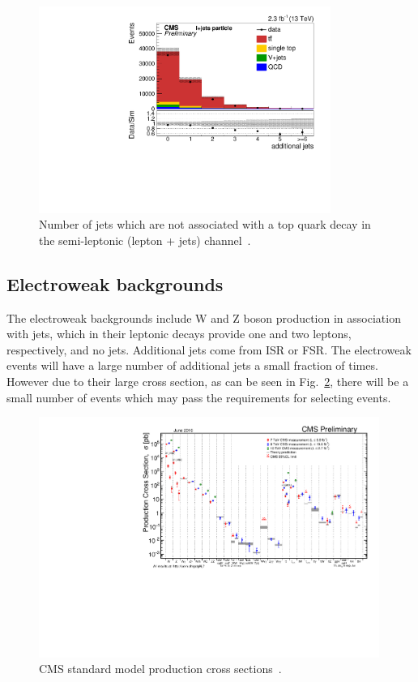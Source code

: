 \begin{figure}[ht!]
\begin{center}
    \includegraphics[width=0.85\textwidth]{images/Theory/ttbarAdd.pdf}
    \caption{Number of jets which are not associated with a top quark decay in the \ttbar semi-leptonic (lepton + jets) channel~\cite{CMS-PAS-TOP-16-008}.}
    \label{fig:ttbarAdd}
\end{center}
\end{figure}

\subsection{Electroweak backgrounds}
The electroweak backgrounds include W and Z boson production in association with jets, which in their leptonic decays provide one and two leptons, respectively, and no jets. Additional jets come from ISR or FSR. The electroweak events will have a large number of additional jets a small fraction of times. However due to their large cross section, as can be seen in Fig.~\ref{fig:CMSstairway}, there will be a small number of events which may pass the requirements for selecting \tttt events.
\begin{figure}[ht!]
\begin{center}
    \includegraphics[width=0.99\textwidth]{images/Theory/stairway.pdf}
    \caption{CMS standard model production cross sections~\cite{stairwaytwiki}.}
    \label{fig:CMSstairway}
\end{center}
\end{figure}

